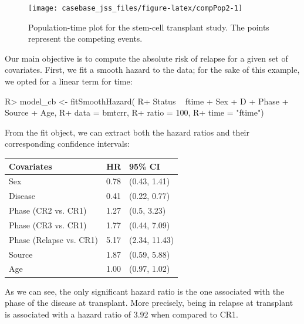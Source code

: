 \documentclass[article]{jss}
\begin{document}
\begin{CodeChunk}
\begin{figure}

{\centering \texttt{[image: casebase\_jss\_files/figure-latex/compPop2-1]} 

}

\caption{\label{fig:compPop2}Population-time plot for the stem-cell transplant study. The points represent the competing events.}\label{fig:compPop2}
\end{figure}
\end{CodeChunk}

Our main objective is to compute the absolute risk of relapse for a
given set of covariates. First, we fit a smooth hazard to the data; for
the sake of this example, we opted for a linear term for time:

\begin{CodeChunk}

\begin{CodeInput}
R> model_cb <- fitSmoothHazard(
R+     Status ~ ftime + Sex + D + Phase + Source + Age, 
R+     data = bmtcrr, 
R+     ratio = 100, 
R+     time = "ftime")
\end{CodeInput}
\end{CodeChunk}

From the fit object, we can extract both the hazard ratios and their
corresponding confidence intervals:

\begin{CodeChunk}

\begin{tabular}{l|r|l}
\hline
Covariates & HR & 95\% CI\\
\hline
Sex & 0.78 & (0.43, 1.41)\\
\hline
Disease & 0.41 & (0.22, 0.77)\\
\hline
Phase (CR2 vs. CR1) & 1.27 & (0.5, 3.23)\\
\hline
Phase (CR3 vs. CR1) & 1.77 & (0.44, 7.09)\\
\hline
Phase (Relapse vs. CR1) & 5.17 & (2.34, 11.43)\\
\hline
Source & 1.87 & (0.59, 5.88)\\
\hline
Age & 1.00 & (0.97, 1.02)\\
\hline
\end{tabular}

\end{CodeChunk}

As we can see, the only significant hazard ratio is the one associated
with the phase of the disease at transplant. More precisely, being in
relapse at transplant is associated with a hazard ratio of 3.92 when
compared to CR1.
\end{document}
